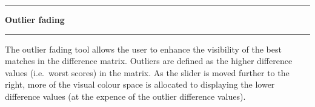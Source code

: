 \noindent\rule{\textwidth}{1pt}
\indent \textbf{Outlier fading}
\noindent\rule{\textwidth}{1pt}
\smallskip
\parbox{\textwidth}{The outlier fading tool allows the user to enhance the visibility of the best matches in the difference matrix. Outliers are defined as the higher difference values (i.e.\ worst scores) in the matrix. As the slider is moved further to the right, more of the visual colour space is allocated to displaying the lower difference values (at the expence of the outlier difference values).}
\smallskip
